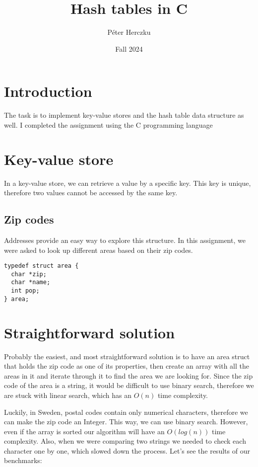\documentclass[a4paper,11pt]{article}
\begin{document}
    \title{
        \textbf{Hash tables in C}
    }
    \author{Péter Herczku}
    \date{Fall 2024}

    \maketitle

    \section*{Introduction}

    The task is to implement key-value stores and the hash table data structure as well.
    I completed the assignment using the C programming language
    
    \section*{Key-value store}

    In a key-value store, we can retrieve a value by a specific key.
    This key is unique, therefore two values cannot be accessed by the same key.

    \subsection*{Zip codes}

    Addresses provide an easy way to explore this structure.
    In this assignment, we were asked to look up different areas based on their zip codes.

    \begin{verbatim}
typedef struct area {
  char *zip;
  char *name;
  int pop;
} area;
    \end{verbatim}

    \section*{Straightforward solution}

    Probably the easiest, and most straightforward solution is to have an area struct that holds the zip code as one of its properties, then create an array with all the areas in it and iterate through it to find the area we are looking for.
    Since the zip code of the area is a string, it would be difficult to use binary search, therefore we are stuck with linear search, which has an $O(n)$ time complexity.
    
    Luckily, in Sweden, postal codes contain only numerical characters, therefore we can make the zip code an Integer.
    This way, we can use binary search.
    However, even if the array is sorted our algorithm will have an $O(log(n))$ time complexity.
    Also, when we were comparing two strings we needed to check each character one by one, which slowed down the process.
    Let's see the results of our benchmarks:
\end{document}
